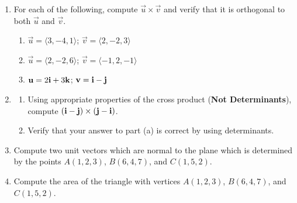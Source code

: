 \documentclass[12pt]{article}
\newif\ifans
\begin{document}
\begin{enumerate}

\item For each of the following, compute $\overrightarrow{u}\times\overrightarrow{v}$ and verify that it is orthogonal to both $\overrightarrow{u}$ and $\overrightarrow{v}$.

\begin{enumerate}

\item $\overrightarrow{u}=\langle 3,-4,1 \rangle$; $\overrightarrow{v}=\langle 2,-2,3 \rangle$

\ifans{\fbox{$\langle -10,-7,2\rangle$}} \fi

\item $\overrightarrow{u}=\langle 2,-2,6 \rangle$; $\overrightarrow{v}=\langle -1,2,-1 \rangle$

\ifans{\fbox{$\langle -10,-4,2\rangle$}} \fi

\item ${\bf u}=2{\bf i}+3{\bf k}$; ${\bf v}={\bf i}-{\bf j}$

\ifans{\fbox{$\langle 3,3,-2\rangle$}} \fi

\end{enumerate}

\item \begin{enumerate}

\item Using appropriate properties of the cross product ({\bf Not Determinants}), compute $({\bf i}-{\bf j})\times({\bf j}-{\bf i})$.

\ifans{\fbox{${\bf 0}$}} \fi

\item Verify that your answer to part (a) is correct by using determinants.

\ifans{\fbox{${\bf 0}$}} \fi

\end{enumerate}

\item Compute two unit vectors which are normal to the plane which is determined by the points $A(1,2,3)$, $B(6,4,7)$, and $C(1,5,2)$.

\ifans{\fbox{$\overrightarrow{u_{1,2}}=\pm\frac{1}{\sqrt{446}}\langle -14,5,15 \rangle$}} \fi

\item Compute the area of the triangle with vertices $A(1,2,3)$, $B(6,4,7)$, and $C(1,5,2)$.

\ifans{\fbox{$\frac{1}{2}\sqrt{446}$}} \fi


\end{enumerate}
\end{document}
